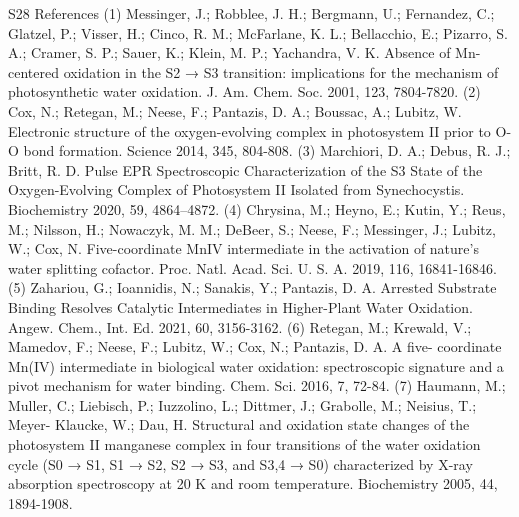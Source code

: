 S28 
References 
(1) 
Messinger, J.; Robblee, J. H.; Bergmann, U.; Fernandez, C.; Glatzel, P.; Visser, H.; Cinco, R. M.; 
McFarlane, K. L.; Bellacchio, E.; Pizarro, S. A.; Cramer, S. P.; Sauer, K.; Klein, M. P.; Yachandra, V. K. 
Absence of Mn-centered oxidation in the S2 → S3 transition: implications for the mechanism of 
photosynthetic water oxidation. J. Am. Chem. Soc. 2001, 123, 7804-7820. 
(2) 
Cox, N.; Retegan, M.; Neese, F.; Pantazis, D. A.; Boussac, A.; Lubitz, W. Electronic structure of 
the oxygen-evolving complex in photosystem II prior to O-O bond formation. Science 2014, 345, 804-808. 
(3) 
Marchiori, D. A.; Debus, R. J.; Britt, R. D. Pulse EPR Spectroscopic Characterization of the S3 
State of the Oxygen-Evolving Complex of Photosystem II Isolated from Synechocystis. Biochemistry 2020, 
59, 4864–4872. 
(4) 
Chrysina, M.; Heyno, E.; Kutin, Y.; Reus, M.; Nilsson, H.; Nowaczyk, M. M.; DeBeer, S.; Neese, 
F.; Messinger, J.; Lubitz, W.; Cox, N. Five-coordinate MnIV intermediate in the activation of nature’s water 
splitting cofactor. Proc. Natl. Acad. Sci. U. S. A. 2019, 116, 16841-16846. 
(5) 
Zahariou, G.; Ioannidis, N.; Sanakis, Y.; Pantazis, D. A. Arrested Substrate Binding Resolves 
Catalytic Intermediates in Higher-Plant Water Oxidation. Angew. Chem., Int. Ed. 2021, 60, 3156-3162. 
(6) 
Retegan, M.; Krewald, V.; Mamedov, F.; Neese, F.; Lubitz, W.; Cox, N.; Pantazis, D. A. A five-
coordinate Mn(IV) intermediate in biological water oxidation: spectroscopic signature and a pivot 
mechanism for water binding. Chem. Sci. 2016, 7, 72-84. 
(7) 
Haumann, M.; Muller, C.; Liebisch, P.; Iuzzolino, L.; Dittmer, J.; Grabolle, M.; Neisius, T.; Meyer-
Klaucke, W.; Dau, H. Structural and oxidation state changes of the photosystem II manganese complex in 
four transitions of the water oxidation cycle (S0 → S1, S1 → S2, S2 → S3, and S3,4 → S0) characterized by 
X-ray absorption spectroscopy at 20 K and room temperature. Biochemistry 2005, 44, 1894-1908.
